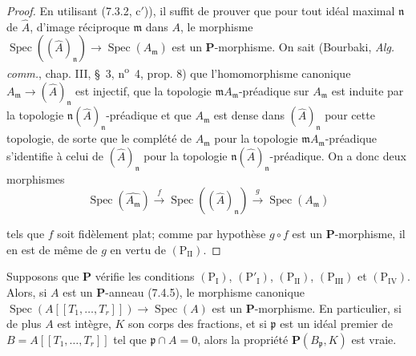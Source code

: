 \begin{proof}
En utilisant (7.3.2, c$'$)), il suffit de prouver que pour tout idéal
maximal $\mathfrak n$ de $\widehat A$, d'image réciproque $\mathfrak m$
dans $A$, le morphisme
$\operatorname{Spec}((\widehat A)_{\mathfrak n})\to
\operatorname{Spec}(A_{\mathfrak m})$ est un $\boldsymbol P$-morphisme.
On sait (Bourbaki, \emph{Alg. comm.}, chap. III, \S~3,
n\textsuperscript{o}~4, prop. 8) que l'homomorphisme canonique
$A_{\mathfrak m}\to(\widehat A)_{\mathfrak n}$ est injectif, que la
topologie $\mathfrak mA_{\mathfrak m}$-préadique sur $A_{\mathfrak m}$ est
induite par la topologie
$\mathfrak n(\widehat A)_{\mathfrak n}$-préadique et que
$A_{\mathfrak m}$ est dense dans $(\widehat A)_{\mathfrak n}$ pour cette
topologie, de sorte que le complété de $A_{\mathfrak m}$ pour la topologie
$\mathfrak mA_{\mathfrak m}$-préadique s'identifie à celui de
$(\widehat A)_{\mathfrak n}$ pour la topologie
$\mathfrak n(\widehat A)_{\mathfrak n}$-préadique. On a donc deux morphismes
\[
\operatorname{Spec}(\widehat{A_{\mathfrak m}})
\xrightarrow{f}\operatorname{Spec}((\widehat A)_{\mathfrak n})
\xrightarrow{g}\operatorname{Spec}(A_{\mathfrak m})
\]


tels que $f$ soit fidèlement plat; comme par hypothèse $g\circ f$ est un
$\boldsymbol P$-morphisme, il en est de même de $g$ en vertu de
$(\mathrm P_{\mathrm{II}})$.
\end{proof}

\begin{corollary}[7.4.7]
\label{IV.2.s7.4.7-fr}
Supposons que $\boldsymbol P$ vérifie les conditions
$(\mathrm P_{\mathrm I})$, $(\mathrm P'_{\mathrm I})$,
$(\mathrm P_{\mathrm{II}})$, $(\mathrm P_{\mathrm{III}})$ et
$(\mathrm P_{\mathrm{IV}})$. Alors, si $A$ est un
$\boldsymbol P$-anneau (7.4.5), le morphisme canonique
$\operatorname{Spec}(A[[T_1,\ldots,T_r]])\to\operatorname{Spec}(A)$ est un
$\boldsymbol P$-morphisme. En particulier, si de plus $A$ est intègre, $K$
son corps des fractions, et si $\mathfrak p$ est un idéal premier de
$B=A[[T_1,\ldots,T_r]]$ tel que $\mathfrak p\cap A=0$, alors la propriété
$\boldsymbol P(B_{\mathfrak p},K)$ est vraie.
\end{corollary}

